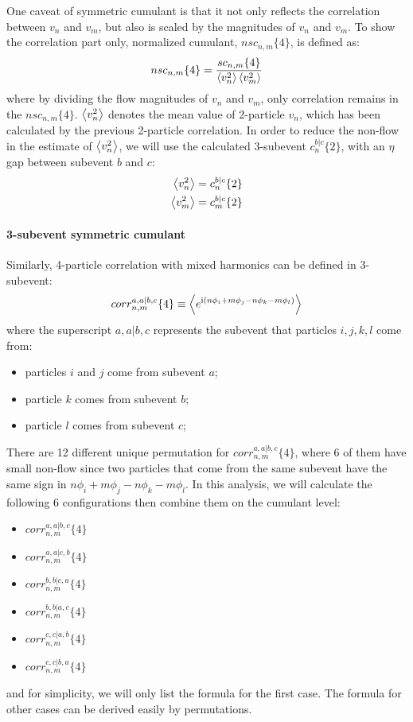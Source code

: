 One caveat of symmetric cumulant is that it not only reflects the correlation between $v_n$ and $v_m$, but also is scaled by the magnitudes of $v_n$ and $v_m$. To show the correlation part only, normalized cumulant, $nsc_{n,m}\{4\}$, is defined as:
\begin{equation}
nsc_{n,m}\{4\} = \frac{sc_{n,m}\{4\}}{\left\langle v_n^2\right\rangle\left\langle v_m^2\right\rangle}
\end{equation}
where by dividing the flow magnitudes of $v_{n}$ and $v_{m}$, only correlation remains in the $nsc_{n,m}\{4\}$. $\left\langle v_n^2\right\rangle$ denotes the mean value of 2-particle $v_n$, which has been calculated by the previous 2-particle correlation. In order to reduce the non-flow in the estimate of $\left\langle v_n^2\right\rangle$, we will use the calculated 3-subevent $c_n^{b|c}\{2\}$, with an $\eta$ gap between subevent $b$ and $c$:
\begin{equation}
\begin{split}
\left\langle v_n^2\right\rangle &= c_n^{b|c}\{2\} \\
\left\langle v_m^2\right\rangle &= c_m^{b|c}\{2\}
\end{split}
\end{equation}



\paragraph{3-subevent symmetric cumulant}
Similarly, 4-particle correlation with mixed harmonics can be defined in 3-subevent:
\begin{equation}
corr_{n,m}^{a,a|b,c}\{4\}\equiv\left\langle e^{\text{i}(n\phi_i+m\phi_j-n\phi_k-m\phi_l)}\right\rangle
\end{equation}
where the superscript $a,a|b,c$ represents the subevent that particles $i,j,k,l$ come from:
\begin{itemize}
\item particles $i$ and $j$ come from subevent $a$;
\item particle $k$ comes from subevent $b$;
\item particle $l$ comes from subevent $c$;
\end{itemize}

There are 12 different unique permutation for $corr_{n,m}^{a,a|b,c}\{4\}$, where 6 of them have small non-flow since two particles that come from the same subevent have the same sign in $n\phi_i+m\phi_j-n\phi_k-m\phi_l$. In this analysis, we will calculate the following 6 configurations then combine them on the cumulant level:
\begin{itemize}
\item $corr_{n,m}^{a,a|b,c}\{4\}$
\item $corr_{n,m}^{a,a|c,b}\{4\}$
\item $corr_{n,m}^{b,b|c,a}\{4\}$
\item $corr_{n,m}^{b,b|a,c}\{4\}$
\item $corr_{n,m}^{c,c|a,b}\{4\}$
\item $corr_{n,m}^{c,c|b,a}\{4\}$
\end{itemize}
and for simplicity, we will only list the formula for the first case. The formula for other cases can be derived easily by permutations.

